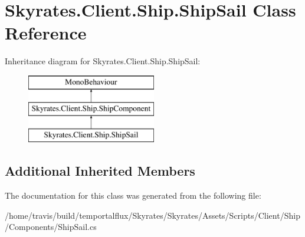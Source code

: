 \hypertarget{class_skyrates_1_1_client_1_1_ship_1_1_ship_sail}{\section{Skyrates.\-Client.\-Ship.\-Ship\-Sail Class Reference}
\label{class_skyrates_1_1_client_1_1_ship_1_1_ship_sail}
}
Inheritance diagram for Skyrates.\-Client.\-Ship.\-Ship\-Sail\-:\begin{figure}[H]
\begin{center}
\leavevmode
\includegraphics[height=3.000000cm]{class_skyrates_1_1_client_1_1_ship_1_1_ship_sail}
\end{center}
\end{figure}
\subsection*{Additional Inherited Members}


The documentation for this class was generated from the following file\-:\begin{DoxyCompactItemize}
\item 
/home/travis/build/temportalflux/\-Skyrates/\-Skyrates/\-Assets/\-Scripts/\-Client/\-Ship/\-Components/Ship\-Sail.\-cs\end{DoxyCompactItemize}
